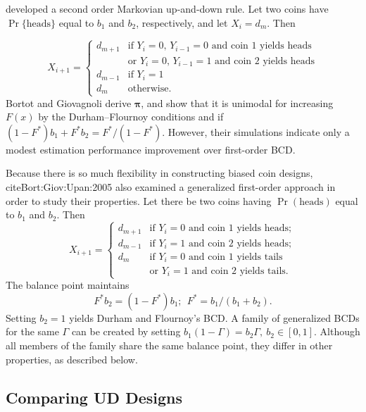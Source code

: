 \citep{Bort:Giov:Upan:2005} developed a second order Markovian up-and-down rule. Let two coins have $\Pr\{\textrm{heads}\}$ equal to $b_1$ and $b_2$, respectively, and let $X_i=d_m$. Then

\begin{equation*}
X_{i+1}=
\begin{cases}
d_{m+1} &\textrm{if $Y_i=0$, $Y_{i-1}=0$ and coin 1 yields heads}\\
        &\textrm{or $Y_i=0$, $Y_{i-1}=1$ and coin 2 yields heads}\\
d_{m-1} &\textrm{if $Y_i=1$}\\
d_m &\textrm{otherwise.}
\end{cases}
\end{equation*}
%
Bortot and Giovagnoli derive $\boldsymbol{\pi}$, and show that it is unimodal for increasing $F(x)$ by the Durham--Flournoy
conditions and if $(1-F^*)b_1+F^*b_2=F^*/(1-F^*)$. However, their simulations indicate only a modest estimation performance improvement over first-order BCD.

Because there is so much flexibility in constructing biased coin designs, cite{Bort:Giov:Upan:2005} also examined a generalized first-order approach in order to study their properties. Let there be two coins having $\Pr\left(\textrm{heads}\right)$ equal to $b_1$ and $b_2$. Then
\begin{equation}\label{eq:BortotCombo}
X_{i+1}=
\begin{cases}
d_{m+1} &\textrm{if $Y_i=0$ and coin 1 yields heads};\\
d_{m-1} &\textrm{if $Y_i=1$ and coin 2 yields heads};\\
d_{m} &\textrm{if $Y_i=0$ and coin 1 yields tails}\\
        &\textrm{or $Y_i=1$ and coin 2 yields tails.}
\end{cases}
\end{equation}
\noindent The balance point maintains
\begin{equation*}
F^*b_2=\left(1-F^*\right)b_1;\ \ F^*=b_1/(b_1+b_2).
\end{equation*}
\noindent Setting $b_2=1$ yields Durham and Flournoy's BCD. A family of generalized BCDs for the same $\Gamma$ can be created by setting $b_1(1-\Gamma)=b_2\Gamma,\ b_2\in [0,1]$. Although all members of the family share the same balance point, they differ in other properties, as described below.

\subsection{Comparing UD Designs}

